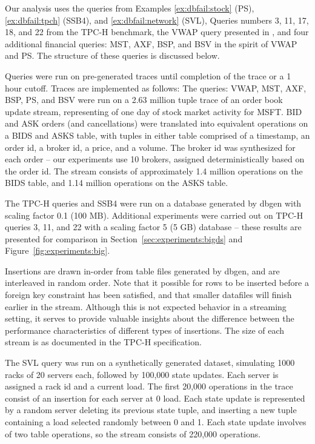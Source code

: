 Our analysis uses the queries from Examples \ref{ex:dbfail:stock} (PS),  \ref{ex:dbfail:tpch} (SSB4), and \ref{ex:dbfail:network} (SVL), Queries numbers 3, 11, 17, 18, and 22 from the TPC-H\cite{tpch} benchmark, the VWAP query presented in \cite{kennedy-ahmad-koch-cidr:11}, and four additional financial queries: MST, AXF, BSP, and BSV in the spirit of VWAP and PS.  The structure of these queries is discussed below.

Queries were run on pre-generated traces until completion of the trace or a 1 hour cutoff.  Traces are implemented as follows: The queries: VWAP, MST, AXF, BSP, PS, and BSV were run on a 2.63 million tuple trace of an order book update stream, representing of one day of stock market activity for MSFT.  BID and ASK orders (and cancellations) were translated into equivalent operations on a BIDS and ASKS table, with tuples in either table comprised of a timestamp, an order id, a broker id, a price, and a volume.  The broker id was synthesized for each order -- our experiments use 10 brokers, assigned deterministically based on the order id.  The stream consists of approximately 1.4 million operations on the BIDS table, and 1.14 million operations on the ASKS table.

The TPC-H queries and SSB4 were run on a database generated by dbgen\cite{tpch} with scaling factor 0.1 (100 MB).  Additional experiments were carried out on TPC-H queries 3, 11, and 22 with a scaling factor 5 (5 GB) database -- these results are presented for comparison in Section~\ref{sec:experiments:bigds} and Figure~\ref{fig:experiments:big}.

Insertions are drawn in-order from table files generated by dbgen, and are interleaved in random order.  Note that it possible for rows to be inserted before a foreign key constraint has been satisfied, and that smaller datafiles will finish earlier in the stream.  Although this is not expected behavior in a streaming setting, it serves to provide valuable insights about the difference between the performance characteristics of different types of insertions.  The size of each stream is as documented in the TPC-H specification\cite{tpch}.

The SVL query was run on a synthetically generated dataset, simulating 1000 racks of 20 servers each, followed by 100,000 state updates.  Each server is assigned a rack id and a current load.  The first 20,000 operations in the trace consist of an insertion for each server at 0 load.  Each state update is represented by a random server deleting its previous state tuple, and inserting a new tuple containing a load selected randomly between 0 and 1.  Each state update involves of two table operations, so the stream consists of 220,000 operations.

